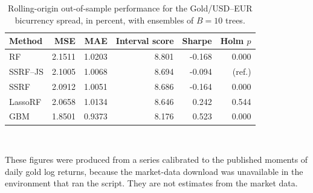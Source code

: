 \begin{table}[htbp]
\centering
\caption{Rolling-origin out-of-sample performance for the Gold/USD--EUR bicurrency spread, in percent, with ensembles of $B=10$ trees.}
\label{tab:bic_B10}
\small
\setlength{\tabcolsep}{5pt}
\begin{tabular}{lrrrrr}
\toprule
Method & MSE & MAE & Interval score & Sharpe & Holm $p$ \\
\midrule
RF & 2.1511 & 1.0203 & 8.801 & -0.168 & 0.000 \\
SSRF--JS & 2.1005 & 1.0068 & 8.694 & -0.094 & (ref.) \\
SSRF & 2.0912 & 1.0051 & 8.686 & -0.164 & 0.000 \\
LassoRF & 2.0658 & 1.0134 & 8.646 & 0.242 & 0.544 \\
GBM & 1.8501 & 0.9373 & 8.176 & 0.523 & 0.000 \\
\bottomrule
\end{tabular}
\\[2pt]
\parbox{\textwidth}{\footnotesize These figures were produced from a series calibrated to the published moments of daily gold log returns, because the market-data download was unavailable in the environment that ran the script. They are not estimates from the market data.}
\end{table}


